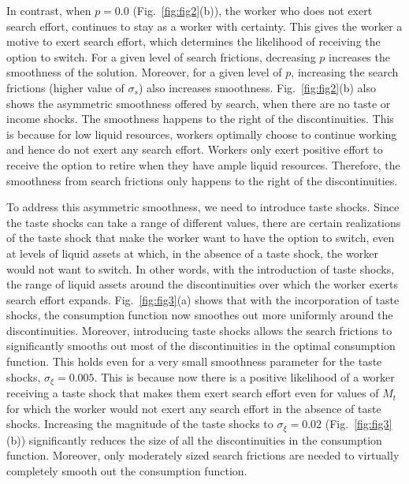 \documentclass[11pt]{article}
\begin{document}
In contrast, when $p = 0.0$ (Fig.~\ref{fig:fig2}(b)), the worker who does not exert search effort,
continues to stay as a worker with certainty. This gives the worker a motive to exert
search effort, which determines the likelihood of receiving the option to switch. For a
given level of search frictions, decreasing $p$ increases the smoothness of the solution.
Moreover, for a given level of $p$, increasing the search frictions (higher value of $\sigma_s$) also
increases smoothness. Fig.~\ref{fig:fig2}(b) also shows the asymmetric smoothness offered by search,
when there are no taste or income shocks. The smoothness happens to the right of the
discontinuities. This is because for low liquid resources, workers optimally choose to
continue working and hence do not exert any search effort. Workers only exert positive
effort to receive the option to retire when they have ample liquid resources. Therefore,
the smoothness from search frictions only happens to the right of the discontinuities.

To address this asymmetric smoothness, we need to introduce taste shocks. Since
the taste shocks can take a range of different values, there are certain realizations of
the taste shock that make the worker want to have the option to switch, even at levels
of liquid assets at which, in the absence of a taste shock, the worker would not want
to switch. In other words, with the introduction of taste shocks, the range of liquid
assets around the discontinuities over which the worker exerts search effort expands.
Fig.~\ref{fig:fig3}(a) shows that with the incorporation of taste shocks, the consumption function now
smoothes out more uniformly around the discontinuities. Moreover, introducing taste
shocks allows the search frictions to significantly smooths out most of the discontinuities
in the optimal consumption function. This holds even for a very small smoothness
parameter for the taste shocks, $\sigma_\xi = 0.005$. This is because now there is a positive
likelihood of a worker receiving a taste shock that makes them exert search effort even
for values of $M_t$ for which the worker would not exert any search effort in the absence
of taste shocks. Increasing the magnitude of the taste shocks to $\sigma_\xi = 0.02$ (Fig.~\ref{fig:fig3}(b))
significantly reduces the size of all the discontinuities in the consumption function.
Moreover, only moderately sized search frictions are needed to virtually completely
smooth out the consumption function.
\end{document}
